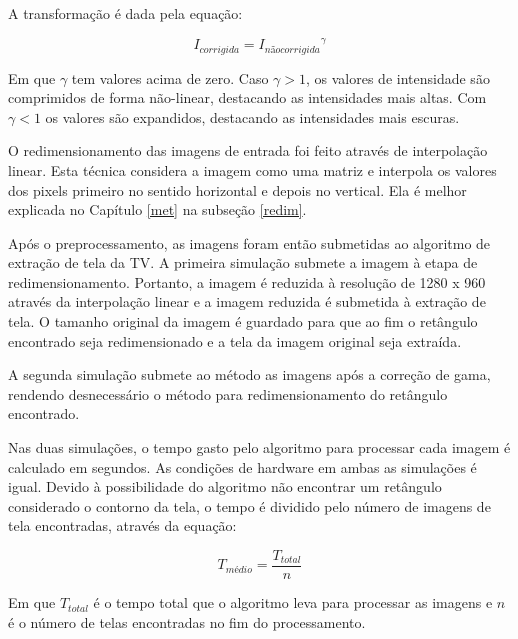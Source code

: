 A transformação é dada pela equação:

\begin{equation}
I_{corrigida} = {I_{não corrigida}}^\gamma
\end{equation}

Em que $\gamma$ tem valores acima de zero. Caso $\gamma >1$, os valores de intensidade são comprimidos de forma não-linear, destacando as intensidades mais altas. Com $\gamma <1$ os valores são expandidos, destacando as intensidades mais escuras.


O redimensionamento das imagens de entrada foi feito através de interpolação linear. Esta técnica considera a imagem como uma matriz e interpola os valores dos pixels primeiro no sentido horizontal e depois no vertical. Ela é melhor explicada no Capítulo \ref{met} na subseção \ref{redim}. %
 

Após o preprocessamento, as imagens foram então submetidas ao algoritmo de extração de tela da TV. A primeira simulação submete a imagem à etapa de redimensionamento. Portanto, a imagem é reduzida à resolução de 1280 x 960 através da interpolação linear e a imagem reduzida é submetida à extração de tela. O tamanho original da imagem é guardado para que ao fim o retângulo encontrado seja redimensionado e a tela da imagem original seja extraída. %

A segunda simulação submete ao método as imagens após a correção de gama, rendendo desnecessário o método para redimensionamento do retângulo encontrado.


Nas duas simulações, o tempo gasto pelo algoritmo para processar cada imagem é calculado em segundos. As condições de hardware em ambas as simulações é igual. Devido à possibilidade do algoritmo não encontrar um retângulo considerado o contorno da tela, o tempo é dividido pelo número de imagens de tela encontradas, através da equação:

\begin{equation}
T_{médio} = \frac{T_{total}}{n}
\end{equation}

Em que $T_{total}$ é o tempo total que o algoritmo leva para processar as imagens e $n$ é o número de telas encontradas no fim do processamento.

